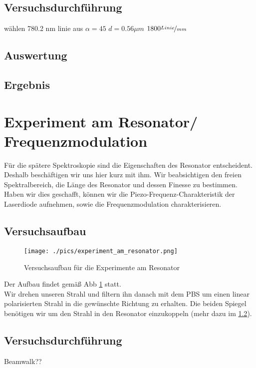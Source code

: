 \documentclass[a4paper,oneside]{article}
\begin{document}
\subsection{Versuchsdurchführung}


wählen 780.2 nm linie aus
$\alpha=45$\textdegree
$d=0.56 \mu m$
$1800\nicefrac{Linie}{mm}$

\subsection{Auswertung}
\subsection{Ergebnis}


\section{Experiment am Resonator/ Frequenzmodulation}
Für die spätere Spektroskopie sind die Eigenschaften des Resonator entscheident. Deshalb beschäftigen wir uns hier kurz mit ihm. Wir beabsichtigen den freien Spektralbereich, die Länge des Resonator und dessen Finesse zu bestimmen. Haben wir dies geschafft, können wir die Piezo-Frequenz-Charakteristik der Laserdiode aufnehmen, sowie die Frequenzmodulation charakterisieren.

\subsection{Versuchsaufbau}
\begin{figure}
 \centering
 \texttt{[image: ./pics/experiment\_am\_resonator.png]}
 \caption{Versuchsaufbau für die Experimente am Resonator}
 \label{Experiment_am_Resonator}
\end{figure}
Der Aufbau findet gemäß Abb \ref{Experiment_am_Resonator} statt.\\
Wir drehen unseren Strahl und filtern ihn danach mit dem PBS um einen linear polarisierten Strahl in die gewünschte Richtung zu erhalten. Die beiden Spiegel benötigen wir um den Strahl in den Resonator einzukoppeln (mehr dazu im \ref{Durchführung_Resonator}).


\subsection{Versuchsdurchführung}
\label{Durchführung_Resonator}
Beamwalk??
\end{document}
